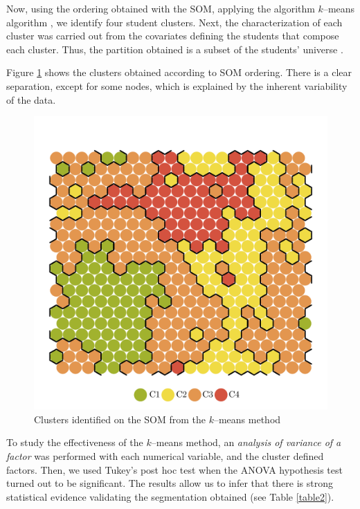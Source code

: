 \documentclass[5p,authoryear,preprint,12pt]{elsarticle}
\begin{document}

Now, using the ordering obtained with the SOM, applying the algorithm $k$--means algorithm \citep{wehrens2007self}, we identify four student clusters. Next, the characterization of each cluster was carried out from the covariates defining the students that compose each cluster. Thus, the partition obtained is a subset of the students' universe \citep{ghosh2008service}. 

Figure \ref{fig2} shows the clusters obtained according to SOM ordering. There is a clear separation, except for some nodes, which is explained by the inherent variability of the data.

\begin{figure}[h]
	\centering
	\includegraphics[trim={1cm 0.5cm 1cm 2.2cm},clip, scale=0.45]{cluster}
	\caption{Clusters identified on the SOM from the $k$--means method}
	\label{fig2} 
\end{figure}

To study the effectiveness of the $k$--means method, an \emph{analysis of variance of a factor} \citep{montgomery2017design} was performed with each numerical variable, and the cluster defined factors. Then, we used Tukey's post hoc test when the ANOVA hypothesis test turned out to be significant. The results allow us to infer that there is strong statistical evidence validating the segmentation obtained (see Table \ref{table2}).
\end{document}
